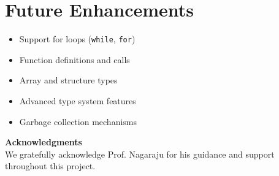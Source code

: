\documentclass[12pt,a4paper]{report}
\begin{document}
\section{Future Enhancements}

\begin{itemize}
    \item Support for loops (\texttt{while}, \texttt{for})
    \item Function definitions and calls
    \item Array and structure types
    \item Advanced type system features
    \item Garbage collection mechanisms
\end{itemize}

\vspace{2cm}

\begin{center}
\textbf{Acknowledgments}\\
\vspace{0.5cm}
We gratefully acknowledge Prof. Nagaraju for his guidance and support throughout this project.
\end{center}
\end{document}
